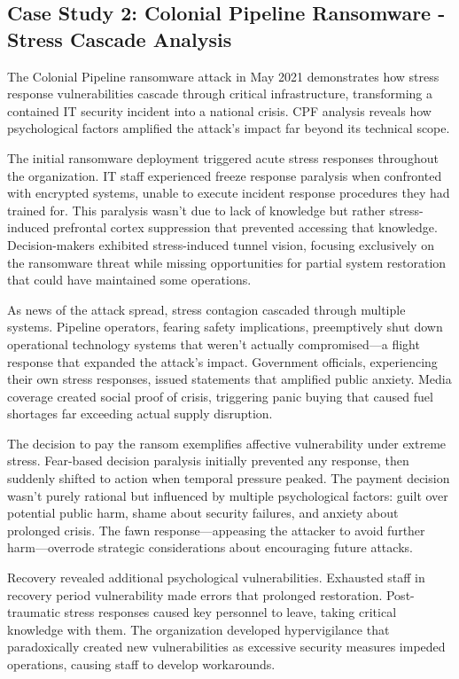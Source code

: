 \documentclass[11pt,a4paper]{article}
\begin{document}
\subsection{Case Study 2: Colonial Pipeline Ransomware - Stress Cascade Analysis}

The Colonial Pipeline ransomware attack in May 2021 demonstrates how stress response vulnerabilities cascade through critical infrastructure, transforming a contained IT security incident into a national crisis. CPF analysis reveals how psychological factors amplified the attack's impact far beyond its technical scope.

The initial ransomware deployment triggered acute stress responses throughout the organization. IT staff experienced freeze response paralysis when confronted with encrypted systems, unable to execute incident response procedures they had trained for. This paralysis wasn't due to lack of knowledge but rather stress-induced prefrontal cortex suppression that prevented accessing that knowledge. Decision-makers exhibited stress-induced tunnel vision, focusing exclusively on the ransomware threat while missing opportunities for partial system restoration that could have maintained some operations.

As news of the attack spread, stress contagion cascaded through multiple systems. Pipeline operators, fearing safety implications, preemptively shut down operational technology systems that weren't actually compromised—a flight response that expanded the attack's impact. Government officials, experiencing their own stress responses, issued statements that amplified public anxiety. Media coverage created social proof of crisis, triggering panic buying that caused fuel shortages far exceeding actual supply disruption.

The decision to pay the ransom exemplifies affective vulnerability under extreme stress. Fear-based decision paralysis initially prevented any response, then suddenly shifted to action when temporal pressure peaked. The payment decision wasn't purely rational but influenced by multiple psychological factors: guilt over potential public harm, shame about security failures, and anxiety about prolonged crisis. The fawn response—appeasing the attacker to avoid further harm—overrode strategic considerations about encouraging future attacks.

Recovery revealed additional psychological vulnerabilities. Exhausted staff in recovery period vulnerability made errors that prolonged restoration. Post-traumatic stress responses caused key personnel to leave, taking critical knowledge with them. The organization developed hypervigilance that paradoxically created new vulnerabilities as excessive security measures impeded operations, causing staff to develop workarounds.
\end{document}
